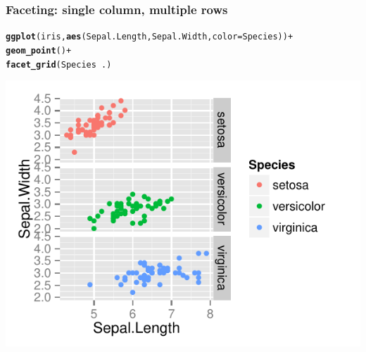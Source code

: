 \documentclass{beamer}\usepackage[]{graphicx}\usepackage[]{color}
\makeatletter
\newcommand{\hlopt}[1]{\textcolor[rgb]{0,0,0}{#1}}%
\newcommand{\hlstd}[1]{\textcolor[rgb]{0.345,0.345,0.345}{#1}}%
\newcommand{\hlkwc}[1]{\textcolor[rgb]{0.333,0.667,0.333}{#1}}%
\newcommand{\hlkwd}[1]{\textcolor[rgb]{0.737,0.353,0.396}{\textbf{#1}}}%
\newenvironment{kframe}{%
 \def\at@end@of@kframe{}%
 \ifinner\ifhmode%
  \def\at@end@of@kframe{\end{minipage}}%
  \begin{minipage}{\columnwidth}%
 \fi\fi%
 \def\FrameCommand##1{\hskip\@totalleftmargin \hskip-\fboxsep
 \colorbox{shadecolor}{##1}\hskip-\fboxsep
     \hskip-\linewidth \hskip-\@totalleftmargin \hskip\columnwidth}%
 \MakeFramed {\advance\hsize-\width
   \@totalleftmargin\z@ \linewidth\hsize
   \@setminipage}}%
 {\par\unskip\endMakeFramed%
 \at@end@of@kframe}
\newenvironment{knitrout}{}{} %
\makeatother
\begin{document}

\begin{frame}[fragile]
\frametitle{Faceting: single column, multiple rows}
\begin{knitrout}\footnotesize
{}\color{fgcolor}\begin{kframe}
\begin{alltt}
\hlkwd{ggplot}\hlstd{(iris,} \hlkwd{aes}\hlstd{(Sepal.Length, Sepal.Width,} \hlkwc{color} \hlstd{= Species))} \hlopt{+}
\hlkwd{geom_point}\hlstd{()} \hlopt{+}
\hlkwd{facet_grid}\hlstd{(Species} \hlopt{~} \hlstd{.)}
\end{alltt}
\end{kframe}

{\centering \includegraphics[width=.75\linewidth]{figure/facetgrid1} 

}



\end{knitrout}
\end{frame}

\end{document}
